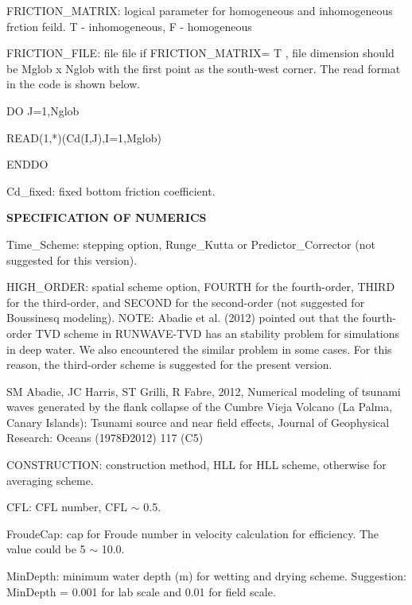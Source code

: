 \documentclass[11pt]{article}
\begin{document}
\begin{description}
\item FRICTION\_MATRIX: logical parameter for homogeneous and inhomogeneous frction feild.  T - inhomogeneous, F - homogeneous

\item FRICTION\_FILE: file file if  FRICTION\_MATRIX= T , file dimension should be Mglob x Nglob with the first point as the south-west corner.  The read format in the code is shown below.

       DO J=1,Nglob
       
        READ(1,*)(Cd(I,J),I=1,Mglob)
        
       ENDDO
\item Cd\_fixed: fixed bottom friction coefficient.

\item {\bf SPECIFICATION OF NUMERICS} 


\item Time\_Scheme: stepping option,  Runge\_Kutta or Predictor\_Corrector (not suggested for this version).

\item HIGH\_ORDER: spatial scheme option,  FOURTH for the fourth-order, THIRD for the third-order, and SECOND for the second-order (not suggested for Boussinesq modeling). NOTE:  Abadie et al. (2012) pointed out that the fourth-order TVD scheme in RUNWAVE-TVD has an stability problem for simulations in deep water. We also encountered the similar problem in some cases. For this reason, the third-order  scheme is suggested for the present version. 

SM Abadie, JC Harris, ST Grilli, R Fabre, 2012, Numerical modeling of tsunami waves generated by the flank collapse of the Cumbre Vieja Volcano (La Palma, Canary Islands): Tsunami source and near field effects, Journal of Geophysical Research: Oceans (1978Ð2012) 117 (C5)

\item CONSTRUCTION: construction method,  HLL for HLL scheme, otherwise for averaging scheme.

\item CFL: CFL number, CFL $\sim$ 0.5.

\item FroudeCap: cap for Froude number in velocity calculation for efficiency. The value could be 5 $\sim$ 10.0.

\item MinDepth: minimum water depth (m) for wetting and drying scheme. Suggestion: MinDepth = 0.001 for lab scale and 0.01 for field scale. 


\end{description}
\end{document}
